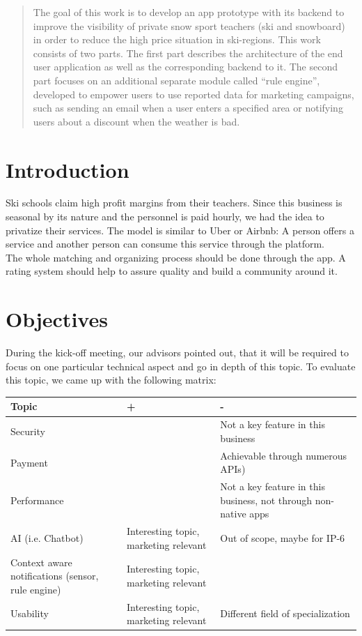 \documentclass[11pt]{article} %
\begin{document}
\begin{abstract}
The goal of this work is to develop an app prototype with its backend to improve the visibility of private snow sport teachers (ski and snowboard) in order to reduce the high price situation in ski-regions. This work consists of two parts. The first part describes the architecture of the end user application as well as the corresponding backend to it. The second part focuses on an additional separate module called “rule engine”, developed to empower users to use reported data for marketing campaigns, such as sending an email when a user enters a specified area or notifying users about a discount when the weather is bad.
\end{abstract}

\newpage
\tableofcontents
\newpage

\section{Introduction}
Ski schools claim high profit margins from their teachers. Since this business is seasonal by its nature and the personnel is paid hourly, we had the idea to privatize their services. The model is similar to Uber or Airbnb: A person offers a service and another person can consume this service through the platform.\\
The whole matching and organizing process should be done through the app. A rating system should help to assure quality and build a community around it.
\newpage

\section{Objectives}
During the kick-off meeting, our advisors pointed out, that it will be required to focus on one particular technical aspect and go in depth of this topic. To evaluate this topic, we came up with the following matrix:

\vspace{0.5cm}
\begin{tabulary}{\linewidth}{LLL}
    \hline
    Topic&+&-\\
    \hline
Security&&Not a key feature in this business\\
Payment&&Achievable through numerous APIs\cite{payment-apis})\\
Performance&&Not a key feature in this business, not through non-native apps\\
AI (i.e. Chatbot)&Interesting topic, marketing relevant&Out of scope, maybe for IP-6\\
Context aware notifications  (sensor, rule engine)&Interesting topic, marketing relevant& \\
Usability&Interesting topic, marketing relevant&Different field of specialization\\
    \hline
\end{tabulary} 
\end{document}
